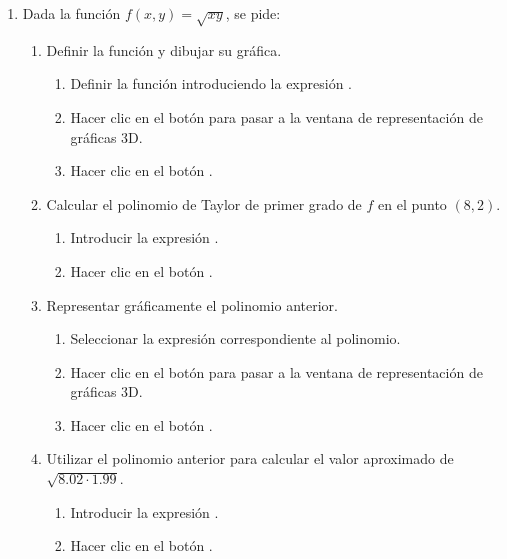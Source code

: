 \begin{enumerate}[leftmargin=*]
\item Dada la función $f(x,y)=\sqrt{xy}$, se pide:
\begin{enumerate}
\item Definir la función y dibujar su gráfica.
\begin{indicacion}
\begin{enumerate}
\item Definir la función introduciendo la expresión .
\item Hacer clic en el botón  para pasar a la ventana de representación de gráficas 3D.
\item Hacer clic en el botón .
\end{enumerate}
\end{indicacion}

\item Calcular el polinomio de Taylor de primer grado de $f$ en el punto $(8,2)$.
\begin{indicacion}
\begin{enumerate}
\item Introducir la expresión .
\item Hacer clic en el botón .
\end{enumerate}
\end{indicacion}

\item Representar gráficamente el polinomio anterior.
\begin{indicacion}
\begin{enumerate}
\item Seleccionar la expresión correspondiente al polinomio. 
\item Hacer clic en el botón  para pasar a la ventana de representación de gráficas 3D.
\item Hacer clic en el botón .
\end{enumerate}
\end{indicacion}

\item Utilizar el polinomio anterior para calcular el valor aproximado de $\sqrt{8.02\cdot 1.99}$.
\begin{indicacion}
\begin{enumerate}
\item Introducir la expresión .
\item Hacer clic en el botón .
\end{enumerate}
\end{indicacion}


\end{enumerate}
\end{enumerate}

